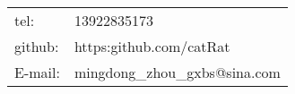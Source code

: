 \begin{tabular}{ll}
tel: & 13922835173 \\
github: & https:github.com/catRat \\
E-mail: & mingdong\_zhou\_gxbs@sina.com \\
\end{tabular}
